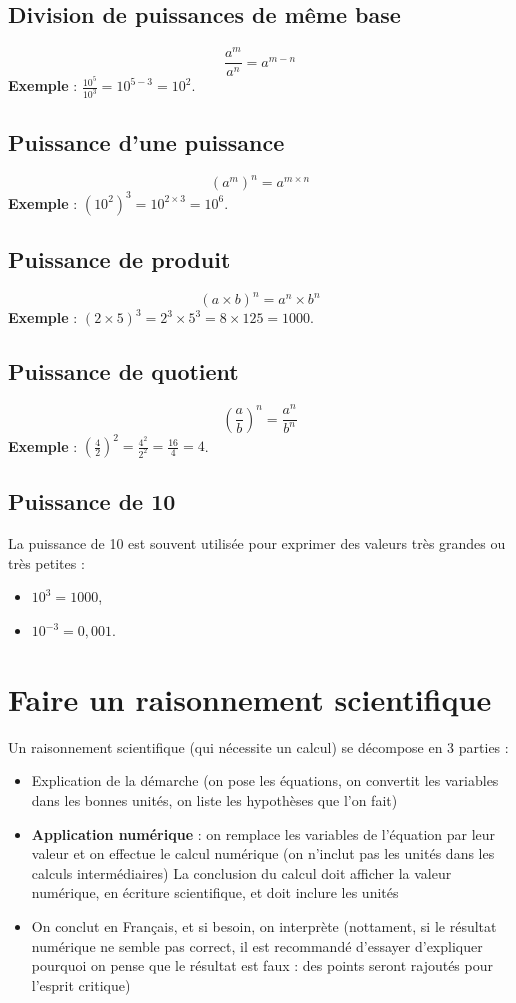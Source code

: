 \documentclass[a4paper,12pt]{article}
\begin{document}
\subsection{Division de puissances de même base}
\[
\frac{a^m}{a^n} = a^{m - n}
\]
\textbf{Exemple} : $ \frac{10^5}{10^3} = 10^{5-3} = 10^2 $.

\subsection{Puissance d'une puissance}
\[
(a^m)^n = a^{m \times n}
\]
\textbf{Exemple} : $ (10^2)^3 = 10^{2 \times 3} = 10^6 $.

\subsection{Puissance de produit}
\[
(a \times b)^n = a^n \times b^n
\]
\textbf{Exemple} : $ (2 \times 5)^3 = 2^3 \times 5^3 = 8 \times 125 = 1000 $.

\subsection{Puissance de quotient}
\[
\left(\frac{a}{b}\right)^n = \frac{a^n}{b^n}
\]
\textbf{Exemple} : $ \left(\frac{4}{2}\right)^2 = \frac{4^2}{2^2} = \frac{16}{4} = 4 $.

\subsection{Puissance de 10}
La puissance de 10 est souvent utilisée pour exprimer des valeurs très grandes ou très petites :
\begin{itemize}[noitemsep]
    \item $ 10^3 = 1000 $,
    \item $ 10^{-3} = 0,001 $.
\end{itemize}

\section{Faire un raisonnement scientifique}

Un raisonnement scientifique (qui nécessite un calcul) se décompose en 3 parties :
\begin{itemize}[noitemsep]
  \item Explication de la démarche (on pose les équations, on convertit les variables dans les bonnes unités, on liste les hypothèses que l'on fait)
  \item \textbf{Application numérique} : on remplace les variables de l'équation par leur valeur et on effectue le calcul numérique (on n'inclut pas les unités dans les calculs intermédiaires) La conclusion du calcul doit afficher la valeur numérique, en écriture scientifique, et doit inclure les unités
  \item On conclut en Français, et si besoin, on interprète (nottament, si le résultat numérique ne semble pas correct, il est recommandé d'essayer d'expliquer pourquoi on pense que le résultat est faux : des points seront rajoutés pour l'esprit critique)
\end{itemize}
\end{document}
